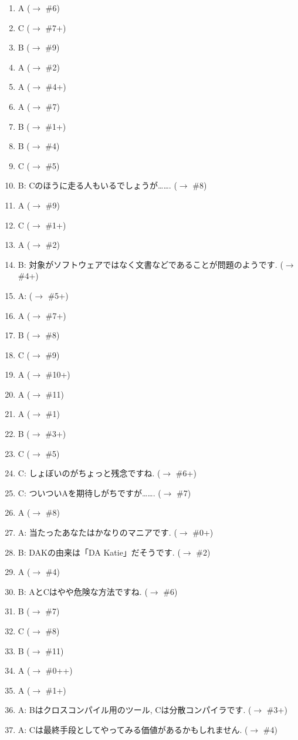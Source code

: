 \documentclass[mingoth,a4paper]{jsarticle}
\begin{document}
\begin{enumerate}
 \item A ($\to$ \#6)
 \item C ($\to$ \#7+)
 \item B ($\to$ \#9)
 \item A ($\to$ \#2)
 \item A ($\to$ \#4+)
 \item A ($\to$ \#7)
 \item B ($\to$ \#1+)
 \item B ($\to$ \#4)
 \item C ($\to$ \#5)
 \item B: Cのほうに走る人もいるでしょうが……. ($\to$ \#8)
 \item A ($\to$ \#9)
 \item C ($\to$ \#1+)
 \item A ($\to$ \#2)
 \item B: 対象がソフトウェアではなく文書などであることが問題のようです. ($\to$ \#4+)
 \item A: ($\to$ \#5+)
 \item A ($\to$ \#7+)
 \item B ($\to$ \#8)
 \item C ($\to$ \#9)
 \item A ($\to$ \#10+)
 \item A ($\to$ \#11)
 \item A ($\to$ \#1)
 \item B ($\to$ \#3+)
 \item C ($\to$ \#5)
 \item C: しょぼいのがちょっと残念ですね. ($\to$ \#6+)
 \item C: ついついAを期待しがちですが……. ($\to$ \#7)
 \item A ($\to$ \#8)
 \item A: 当たったあなたはかなりのマニアです. ($\to$ \#0+)
 \item B: DAKの由来は「DA Katie」だそうです. ($\to$ \#2)
 \item A ($\to$ \#4)
 \item B: AとCはやや危険な方法ですね. ($\to$ \#6)
 \item B ($\to$ \#7)
 \item C ($\to$ \#8)
 \item B ($\to$ \#11)
 \item A ($\to$ \#0++)
 \item A ($\to$ \#1+)
 \item A: Bはクロスコンパイル用のツール, Cは分散コンパイラです. ($\to$ \#3+)
 \item A: Cは最終手段としてやってみる価値があるかもしれません. ($\to$ \#4)

\end{enumerate}
\end{document}
